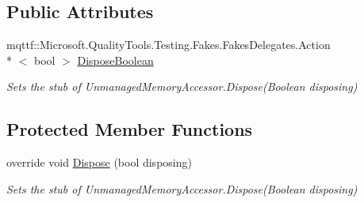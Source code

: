 \subsection*{Public Attributes}
\begin{DoxyCompactItemize}
\item 
mqttf\-::\-Microsoft.\-Quality\-Tools.\-Testing.\-Fakes.\-Fakes\-Delegates.\-Action\\*
$<$ bool $>$ \hyperlink{class_system_1_1_i_o_1_1_fakes_1_1_stub_unmanaged_memory_accessor_a4ea85c19dffb4226e19961cbcb432ad1}{Dispose\-Boolean}
\begin{DoxyCompactList}\small\item\em Sets the stub of Unmanaged\-Memory\-Accessor.\-Dispose(\-Boolean disposing)\end{DoxyCompactList}\end{DoxyCompactItemize}
\subsection*{Protected Member Functions}
\begin{DoxyCompactItemize}
\item 
override void \hyperlink{class_system_1_1_i_o_1_1_fakes_1_1_stub_unmanaged_memory_accessor_ac5498d51f00986ddb5087d407d83eb13}{Dispose} (bool disposing)
\begin{DoxyCompactList}\small\item\em Sets the stub of Unmanaged\-Memory\-Accessor.\-Dispose(\-Boolean disposing)\end{DoxyCompactList}\end{DoxyCompactItemize}
